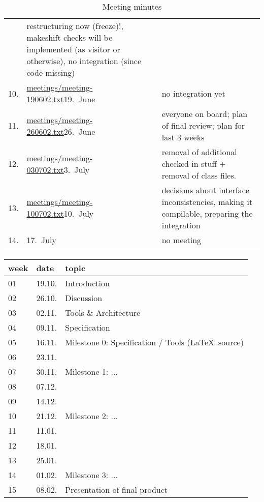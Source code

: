 \begin{table}[htbp]
\begin{tabular}[t]{r@{\quad}l@{\quad\quad}p{9cm}}
    &
    restructuring now (freeze)!, makeshift checks will be implemented 
    (as visitor or otherwise), no integration (since code
    missing)
    \\
    10. 
    &
    \url{meetings/meeting-190602.txt}{19.\ June}
    &
    no integration yet
    \\
    11. 
    &
    \url{meetings/meeting-260602.txt}{26.\ June}
    &
    everyone on board; plan of final review;
    plan for last 3 weeks
    \\
    12. 
    &
    \url{meetings/meeting-030702.txt}{3.\ July}
    &
    removal of additional checked in stuff +
    removal of class files.
    \\
    13. 
    &
    \url{meetings/meeting-100702.txt}{10.\ July}
    &
    decisions about interface inconsistencies,
    making it compilable, 
    preparing the integration
    \\
    14. 
    &
    17.\ July
    &
    no meeting
    \\
\fi
  \end{tabular}
    \caption{Meeting minutes}
    \label{tab:meetings}
  \end{table}



\begin{tabular}{|l|l|l|}
\hline
week & date & topic 
\\\hline
01 & 19.10. & Introduction\\
02 & 26.10. & Discussion\\
03 & 02.11. & Tools \& Architecture\\
04 & 09.11. & Specification\\
05 & 16.11. & {Milestone 0}: Specification / Tools (\LaTeX\ source)\\
06 & 23.11. &\\
07 & 30.11. &  {Milestone 1:} ...\\
08 & 07.12. &\\
09 & 14.12. &\\
10 & 21.12. & Milestone 2: ...\\
11 & 11.01. &\\
12 & 18.01. &\\
13 & 25.01. &\\
14 & 01.02. & Milestone 3: ...\\
15 & 08.02. & Presentation of final product\\
\hline
\end{tabular}



